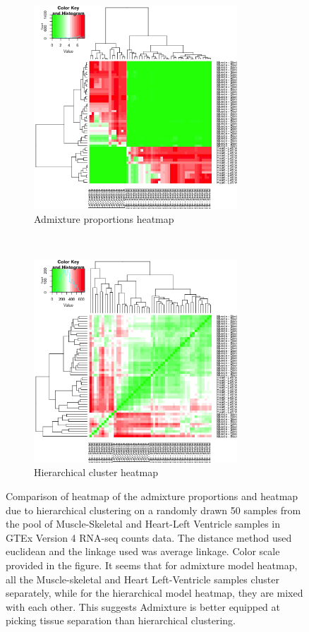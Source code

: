 \begin{figure}[ht]
    \centering
    \begin{subfigure}[t]{0.5\textwidth}
        \centering
        \includegraphics[height=3in]{../plots/heart_muscle_admixture_heatmap.png}
        \caption{Admixture proportions heatmap}
    \end{subfigure}%
    ~ 
    \begin{subfigure}[t]{0.5\textwidth}
        \centering
        \includegraphics[height=3in]{../plots/heart_muscle_hierarchical_heatmap.png}
        \caption{Hierarchical cluster heatmap}
    \end{subfigure}
    \caption{Comparison of heatmap of the admixture proportions and heatmap due to hierarchical clustering on  a randomly drawn 50 samples from the pool of Muscle-Skeletal and Heart-Left Ventricle samples in GTEx Version 4 RNA-seq counts data. The distance method used euclidean and the linkage used was average linkage. Color scale provided in the figure. It seems that for admixture model heatmap, all the Muscle-skeletal and Heart Left-Ventricle samples cluster separately, while for the hierarchical model heatmap, they are mixed with each other. This suggests Admixture is better equipped at picking tissue separation than hierarchical clustering.}
\end{figure}

